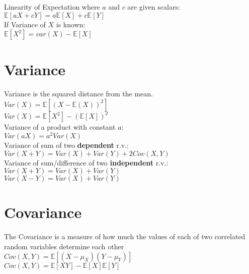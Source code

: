 Linearity of Expectation where $a$ and $c$ are given scalars:\\

$\mathbb{E}[aX + c Y] = a\mathbb{E}[X] + c\mathbb{E}[Y]$\\

If Variance of $X$ is known:\\

$\mathbb{E}[X^2] = var(X) - \mathbb{E}[X]$\\


\section{Variance}

Variance is the squared distance from the mean.\\

$Var(X)=\mathbb{E}[(X-\mathbb{E}(X))^2]$\\

$Var\left(X\right)=\mathbb{E}\left[X^2\right]-\left(\mathbb{E}\left[X\right]\right)^2$\\

Variance of a product with constant $a$:\\

$Var(aX)=a^2 Var\left(X\right)$\\

Variance of sum of two \textbf{dependent} r.v.:\\

$Var(X + Y)=Var(X)+Var(Y)+2Cov(X,Y)$\\

Variance of sum/difference of two \textbf{independent} r.v.:\\

$Var(X + Y)=Var(X)+Var(Y)$\\

$Var(X - Y)=Var(X)+Var(Y)$\\

\section{Covariance}

The Covariance is a measure of how much the values of each of two correlated random variables determine each other\\

$Cov(X,Y) = \mathbb E[(X - \mu _ X)(Y - \mu _ Y)]$ \\

$Cov(X,Y) = \mathbb E[XY] - \mathbb E[X]\mathbb E[Y] $\\

